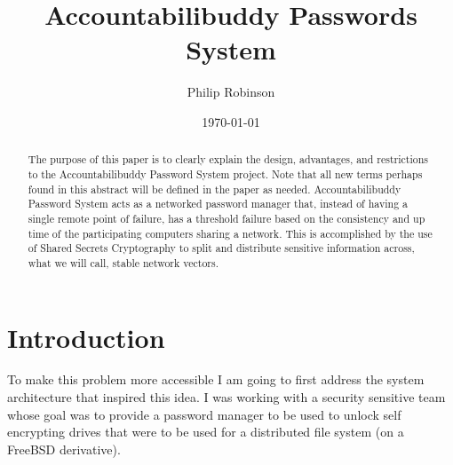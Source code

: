 \documentclass[11pt]{article} %
\title{Accountabilibuddy Passwords System}
\date{\today}
\author{Philip Robinson}
\def\aps{Accountabilibuddy Password System\xspace}
\def\ssc{Shared Secrets Cryptography\xspace}
\def\tf{threshold failure\xspace}
\def\snv{stable network vectors\xspace}
\def\pm{password manager\xspace}
\def\npm{networked \pm}
\def\sed{self encrypting drive\xspace}
\def\seds{\sed{s}\xspace}
\def\bsd{FreeBSD\xspace}
\begin{document}
\maketitle
{}
\begin{abstract}
The purpose of this paper is to clearly explain the design, advantages, and restrictions to the \aps project. Note that all new terms perhaps found in this abstract will be defined in the paper as needed. \aps acts as a \npm that, instead of having a single remote point of failure, has a \tf based on the consistency and up time of the participating computers sharing a network. This is accomplished by the use of \ssc to split and distribute sensitive information across, what we will call, \snv.

\end{abstract}

\section*{Introduction}
To make this problem more accessible I am going to first address the system architecture that inspired this idea. I was working with a security sensitive team whose goal was to provide a \pm to be used to unlock \seds that were to be used for a distributed file system (on a \bsd derivative).
\end{document}

